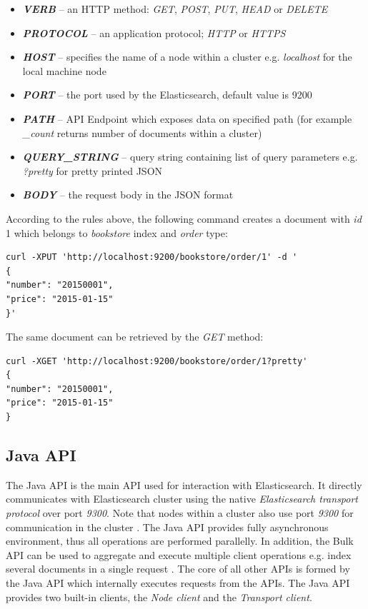 \documentclass[12pt,oneside]{fithesis2}
\begin{document}
\begin{itemize}
	\item \textit{\textbf{VERB}} -- an HTTP method: \textit{GET}, \textit{POST}, \textit{PUT}, \textit{HEAD} or \textit{DELETE}
	\item \textit{\textbf{PROTOCOL}} -- an application protocol; \textit{HTTP} or \textit{HTTPS}
	\item \textit{\textbf{HOST}} -- specifies the name of a node within a cluster e.g. \textit{localhost} for the local machine node
	\item \textit{\textbf{PORT}} -- the port used by the Elasticsearch, default value is 9200
	\item \textit{\textbf{PATH}} -- API Endpoint which exposes data on specified path (for example \textit{\_count} returns number of documents within a cluster)
	\item \textit{\textbf{QUERY\_STRING}} -- query string containing list of query parameters e.g. \textit{?pretty} for pretty printed JSON
	\item \textit{\textbf{BODY}} -- the request body in the JSON format
\end{itemize}

According to the rules above, the following command creates a document with \textit{id} 1 which belongs to \textit{bookstore} index and \textit{order} type:

\begin{lstlisting}[caption = Example of indexing data in Elasticsearch, label = elastic_xput]
curl -XPUT 'http://localhost:9200/bookstore/order/1' -d '
{ 
"number": "20150001", 
"price": "2015-01-15"
}'
\end{lstlisting}

The same document can be retrieved by the \textit{GET} method:
\begin{lstlisting}[caption = Example of retrieving data from Elasticsearch, label = elastic_xget]
curl -XGET 'http://localhost:9200/bookstore/order/1?pretty'
{ 
"number": "20150001", 
"price": "2015-01-15"
}
\end{lstlisting}

\subsection{Java API}
The Java API is the main API used for interaction with Elasticsearch. It directly communicates with Elasticsearch cluster using the native \textit{Elasticsearch transport protocol} over port \textit{9300}. Note that nodes within a cluster also use port \textit{9300} for communication in the cluster \cite[Talking to Elasticsearch]{elasticsearch_defnitive_guide}. The Java API provides fully asynchronous environment, thus all operations are performed parallelly. In addition, the Bulk API can be used to aggregate and execute multiple client operations e.g. index several documents in a single request \cite[Java API]{elasticsearch_java_api_doc}. The core of all other APIs \cite{elasticsearch_doc} is formed by the Java API which internally executes requests from the APIs. The Java API provides two built-in clients, the \textit{Node client} and the \textit{Transport client}.
\end{document}
